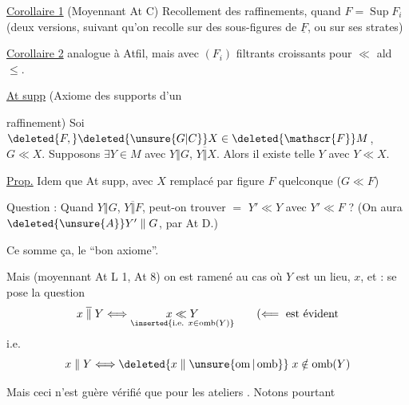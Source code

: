 \uline{Corollaire 1}  (Moyennant At C) Recollement des raffinements, quand $F=\operatorname{Sup}F_i$ (deux versions, suivant qu'on recolle sur des sous-figures de $\underline F$, ou sur ses strates)

\uline{Corollaire 2}  analogue à Atfil, mais avec $(F_i)$ filtrants croissants pour $\ll$ ald $\leq$.

\uline{At supp} (Axiome des supports d'un
\par\noindent\vrule\hspace{.5em}\begin{minipage}{.94\linewidth}
raffinement) Soi $\deleted{F,}\deleted{\unsure{G|C}}X\in\deleted{\mathscr{F}}M$,  $G\ll X$. Supposons $\exists Y\in M$ avec $Y\mathrel{\Vert}G$, $Y\mathrel{\overline{\Vert}}X$. Alors  il existe  telle $Y$ avec $Y\ll X$.
\end{minipage}


\uline{Prop.} Idem que At supp, avec $X$ remplacé par figure $F$ quelconque ($G\ll F$)

Question : Quand $Y\mathrel{\Vert}G$, $Y\mathrel{\overline{\Vert}}F$, peut-on trouver $=$ $Y'\ll Y$ avec $Y'\ll F$ ? (On aura  $\deleted{\unsure{A}}Y'\mathrel{\Vert}G$, par At D.)

Ce  somme ça, le ``bon axiome''.

Mais (moyennant At L 1,  At 8) on est ramené au cas où $Y$ est un lieu,  $x$, et : se pose la question
\[
 x\mathrel{\overline{\Vert}}Y \Longleftrightarrow
 \underset{\inserted{\text{i.e. }x\in\operatorname{omb}(Y)}}{x\ll Y}
 \qquad (\Longleftarrow\ \text{est évident}
\]
i.e.
\[
 x\mathrel{\Vert}Y \Longleftrightarrow
 \deleted{x\mathrel{\Vert}\unsure{\operatorname{om}|\operatorname{omb}}}\;x\notin\operatorname{omb}(Y)
\]

Mais ceci n'est guère vérifié que pour les ateliers . Notons pourtant

